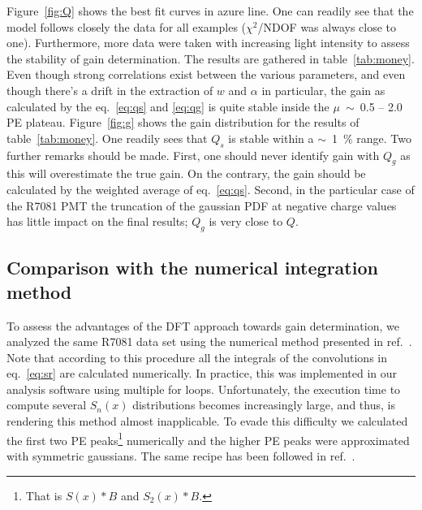 \documentclass[a4paper,11pt]{article}
\begin{document}
Figure~\ref{fig:Q} shows the best fit curves in azure line. 
One can readily see that the model follows closely the data for all examples ($\chi^2$/NDOF was always close to one). 
Furthermore, more data were taken with increasing light intensity to assess the stability of gain determination. 
The results are gathered in table~\ref{tab:money}. 
Even though strong correlations exist between the various parameters, and even though there's a drift in the extraction of $w$ and $\alpha$  in particular,
the gain as calculated by the eq.~\eqref{eq:qs} and \eqref{eq:qg} is quite stable inside the $\mu$~$\sim$~0.5 -- 2.0 PE plateau. 
Figure~\ref{fig:g} shows the gain distribution for the results of table~\ref{tab:money}. One readily sees that $Q_s$ is stable within a $\sim$~1~\% range. 
Two further remarks should be made. First, one should never identify gain with $Q_g$ as this will overestimate the true gain. 
On the contrary, the gain should be calculated by the weighted average of eq.~\eqref{eq:qs}. 
Second, in the particular case of the R7081 PMT the truncation of the gaussian PDF at negative charge values has little impact on the final results; 
$Q_g$ is very close to $Q$. 

\subsection{Comparison with the numerical integration method}
%

To assess the advantages of the DFT approach towards gain determination, we analyzed the same R7081 data set using the numerical method presented in ref.~\cite{dossi}.   
Note that according to this procedure all the integrals of the convolutions in eq.~\eqref{eq:sr} are calculated numerically. 
In practice, this was implemented in our analysis software using multiple for loops. 
Unfortunately, the execution time to compute several $S_n(x)$ distributions becomes increasingly large, and thus, is rendering this method almost inapplicable. 
To evade this difficulty we calculated the first two PE peaks\footnote{That is $S(x)*B$ and $S_2(x)*B$.} numerically and the higher PE peaks were approximated with symmetric gaussians. 
The same recipe has been followed in ref.~\cite{darkside}. 
\end{document}
